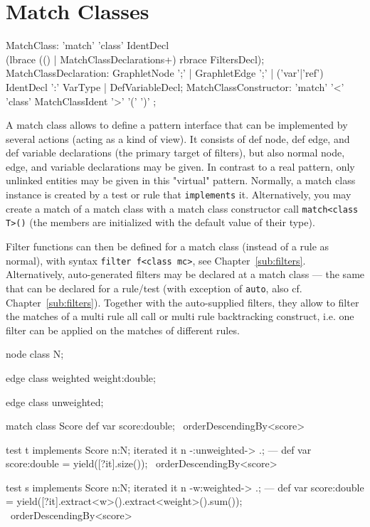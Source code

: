 \section{Match Classes}\label{sec:matchclass}

\begin{rail}
  MatchClass: 'match' 'class' IdentDecl \\
    (lbrace (() | MatchClassDeclarations+) rbrace FiltersDecl);
  MatchClassDeclaration: GraphletNode ';' 
	| GraphletEdge ';' 
	| ('var'|'ref') IdentDecl ':' VarType
	| DefVariableDecl;
  MatchClassConstructor: 'match' '<' 'class' MatchClassIdent '>' '(' ')' ;
\end{rail}

A match class allows to define a pattern interface that can be implemented by several actions (acting as a kind of view).
It consists of def node, def edge, and def variable declarations (the primary target of filters), but also normal node, edge, and variable declarations may be given.
In contrast to a real pattern, only unlinked entities may be given in this "virtual" pattern.
Normally, a match class instance is created by a test or rule that \texttt{implements} it.
Alternatively, you may create a match of a match class with a match class constructor call
\texttt{match<class T>()} (the members are initialized with the default value of their type).

Filter functions can then be defined for a match class (instead of a rule as normal), with syntax \texttt{filter f<class mc>}, see Chapter~\ref{sub:filters}.
Alternatively, auto-generated filters may be declared at a match class --- the same that can be declared for a rule/test (with exception of \texttt{auto}, also cf. Chapter~\ref{sub:filters}).
Together with the auto-supplied filters, they allow to filter the matches of a multi rule all call or multi rule backtracking construct, i.e. one filter can be applied on the matches of different rules.

\begin{example}
  \begin{grgen}
node class N;

edge class weighted
{
	weight:double;
}

edge class unweighted;
  \end{grgen}

  \begin{grgen}
match class Score
{
	def var score:double;
} \ orderDescendingBy<score>

test t implements Score
{
	n:N;
	iterated it {
		n -:unweighted-> .;
	}
---	
	def var score:double = yield([?it].size());
} \ orderDescendingBy<score>

test s implements Score
{
	n:N;
	iterated it {
		n -w:weighted-> .;		
	}
---	
	def var score:double = yield([?it].extract<w>().extract<weight>().sum());
} \ orderDescendingBy<score>
  \end{grgen}\label{exmatchclass}
\end{example}


